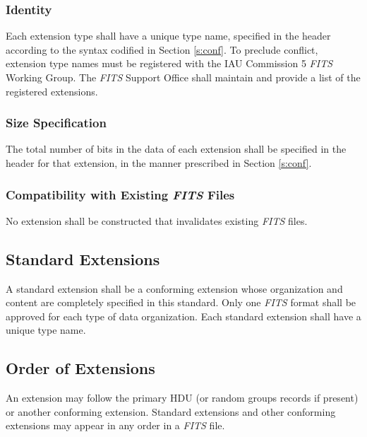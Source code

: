    \subsubsection{Identity}
   \label{s:idy}
   Each extension
   type 
   shall have a unique type name, specified in the
   header according to the syntax codified in Section \ref{s:conf}.
   To preclude conflict, extension type names must be 
   registered
   with the IAU
   Commission 5 {\em FITS\/} Working Group.  
   The {\em FITS} Support Office shall 
   maintain and provide a list of the registered extensions. 
  
   \subsubsection{Size Specification}
   The total number of bits in the data of each extension
   shall be specified in the header for that extension, in the
   manner prescribed in Section \ref{s:conf}.
  
   \subsubsection{Compatibility with Existing {\em\bf FITS} Files}
   No extension shall be 
   constructed that invalidates existing {\em FITS\/} files. 
  
   \subsection{Standard Extensions}
   A standard 
   extension shall be a 
   conforming
   extension whose
   organization and content are completely specified in this standard.
   Only one {\em FITS\/} format
   shall be approved for each type of data organization.  Each
   standard extension shall have a unique type 
   name.
  
   \subsection{Order of Extensions}
   An extension may follow the primary HDU (or 
   random groups records if 
   present) or another conforming
   extension. 
   Standard 
   extensions 
   and other conforming extensions may appear 
   in any order
   in a {\em FITS\/} file.
  
